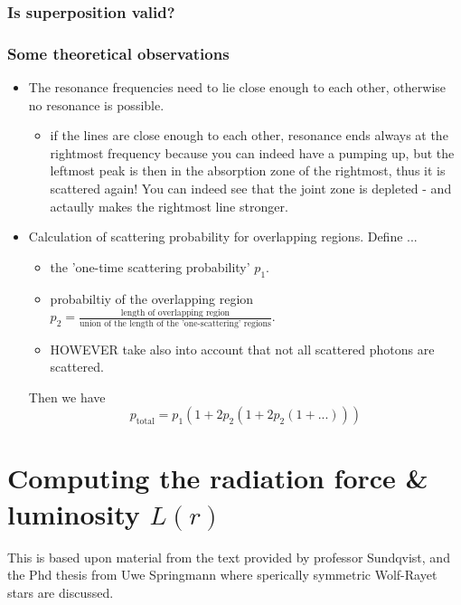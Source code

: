 \documentclass[../main/main.tex]{subfiles}
\begin{document}
\newpage
\subsubsection{Is superposition valid?}

\subsubsection{Some theoretical observations}
\begin{itemize}
\item The resonance frequencies need to lie close enough to each other, otherwise no resonance is possible.

\begin{itemize}
\item if the lines are close enough to each other, resonance ends always at the rightmost frequency because you can indeed have a pumping up, but the leftmost peak is then in the absorption zone of the rightmost, thus it is scattered again! You can indeed see that the joint zone is depleted - and actaully makes the rightmost line stronger.
\end{itemize}


\item Calculation of scattering probability for overlapping regions. Define ...
\begin{itemize}
\item the 'one-time scattering probability' $p_1$.
\item probabiltiy of the overlapping region $p_2 = \frac{\text{length of overlapping region}}{\text{union of the length of the 'one-scattering' regions}}$. 
\item HOWEVER take also into account that not all scattered photons are scattered.
\end{itemize}
Then we have
\begin{equation}
p_{\text{total}} = p_1(1+2p_2(1+2p_2(1+...)))
\end{equation}

\end{itemize}

\newpage
\section{Computing the radiation force \& luminosity $L(r)$}
\label{computing_radiation_force}

This is based upon material from the text provided by professor Sundqvist, and the Phd thesis from Uwe Springmann \cite{UweSpringmannPHD} where sperically symmetric Wolf-Rayet stars are discussed.
\end{document}
